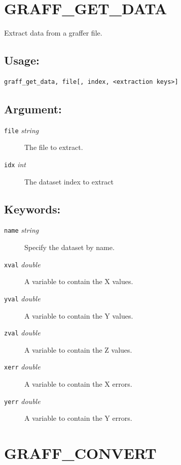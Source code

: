 \documentclass[11pt,twoside,english]{article}
\begin{document}
 \section{GRAFF\_GET\_DATA}
 \label{sec:graff-get-data}

 
	Extract data from a graffer file.

 \subsection{Usage:}
 \label{sec:ggd-usage}

 
\begin{verbatim}
graff_get_data, file[, index, <extraction keys>]
\end{verbatim}

\subsection{ Argument:}
\label{sec:ggd-args}

\begin{description}
\item[\texttt{file} \textit{string}] The file to extract.

\item[\texttt{idx} \textit{int}] The dataset index to extract

\end{description}

\subsection{ Keywords:}
\label{sec:ggd-keys}

\begin{description}
\item[\texttt{name} \textit{string}] Specify the dataset by name.
\item[\texttt{xval} \textit{double}] A variable to contain the X
  values.
\item[\texttt{yval} \textit{double}] A variable to contain the Y
  values.
\item[\texttt{zval} \textit{double}] A variable to contain the Z
  values.
\item[\texttt{xerr} \textit{double}] A variable to contain the X
  errors.
\item[\texttt{yerr} \textit{double}] A variable to contain the Y
  errors.
\end{description}

\section{GRAFF\_CONVERT}
\label{sec:graff_convert}
\end{document}
